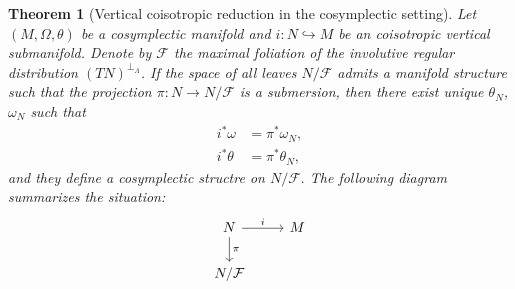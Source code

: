 \documentclass[12pt]{article}
\newtheorem{theorem}{Theorem}[section]
\begin{document}
\begin{theorem}[Vertical coisotropic reduction  in the cosymplectic setting] \label{VerticalCosymplecticReduction} Let $(M, \Omega, \theta)$ be a cosymplectic manifold and $i:N \hookrightarrow M$ be an coisotropic vertical submanifold. Denote by $\mathcal{F}$ the maximal foliation of the involutive regular distribution $(TN)^{\perp_\Lambda}$. If the space of all leaves $N/ \mathcal{F}$ admits a manifold structure such that the projection $\pi : N \rightarrow N/ \mathcal{F}$ is a submersion, then there exist unique $\theta_N$, $\omega_N$ such that
\begin{align*} i^* \omega &= \pi^* \omega_N,\\ i^* \theta &= \pi^* \theta_N, \end{align*} and they define a cosymplectic structre on
$N / \mathcal{F}.$ The following diagram summarizes the situation:
\[ \begin{tikzcd} N \arrow[r, "i"] \arrow[d, "\pi"] & M \\ N / \mathcal{F} \end{tikzcd} \] \end{theorem}
\end{document}
